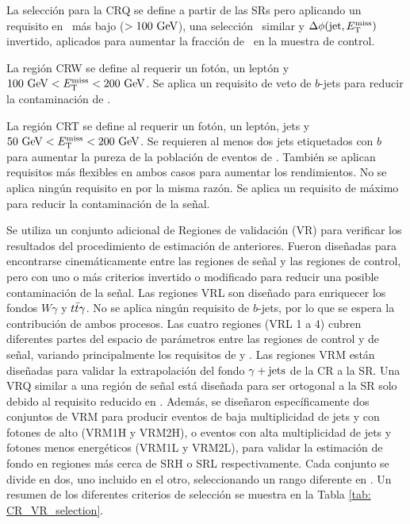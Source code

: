 La selección para la CRQ se define a partir de las SRs pero
aplicando un requisito en \met\ más bajo ($> 100\ \gev $), una selección \HT\ similar
y $ \Delta\phi(\text{jet}, E_{\text{T}}^{\text{miss}})$ invertido, aplicados para aumentar la fracción de
\phj\ en la muestra de control.

La región CRW se define al requerir un fotón, un leptón y $ 100\ \text{GeV} <E_{\text{T}}^{\text{miss}} <200 \ \text{GeV} $. Se aplica un requisito de veto de $b$-jets para reducir la contaminación de \ttbarph.

La región CRT se define al requerir un fotón, un leptón, jets y $ 50 \ \text{GeV} <E_{\text{T}}^{\text{miss}} <200 \ \text{GeV} $. Se requieren al menos dos jets etiquetados con $b$ para aumentar la pureza de la población de eventos de \ttbarph. También se aplican requisitos más flexibles en ambos casos para aumentar los rendimientos. No se aplica ningún requisito en \rtf por la misma razón. Se aplica un requisito de \met máximo para reducir la contaminación de la señal.

Se utiliza un conjunto adicional de Regiones de validación (VR) para verificar
los resultados del procedimiento de estimación de anteriores. Fueron diseñadas para encontrarse
cinemáticamente entre las regiones de señal y las regiones de control, pero con uno o más criterios
invertido o modificado para reducir una posible contaminación de la señal. Las regiones VRL son
diseñado para enriquecer los fondos $ W \gamma $ y $ t\bar{t}\gamma $. No se aplica ningún requisito de $ b $-jets,
por lo que se espera la contribución de ambos procesos. Las cuatro regiones (VRL 1 a 4) cubren
diferentes partes del espacio de parámetros entre las regiones de control y de señal, variando principalmente los requisitos de \met y \HT.
Las regiones VRM están diseñadas para validar la extrapolación del fondo $ \gamma + \text{jets}$ de la CR a la SR.
Una VRQ similar a una región de señal está diseñada para ser ortogonal a la SR solo debido al requisito reducido en \met.
Además, se diseñaron específicamente dos conjuntos de VRM para producir eventos de baja multiplicidad de jets y con fotones de alto \pt (VRM1H y VRM2H), o eventos con alta multiplicidad de jets y fotones menos energéticos (VRM1L y VRM2L), para validar la estimación de fondo en regiones
más cerca de SRH o SRL respectivamente. Cada conjunto se divide en dos, uno incluido en el otro, seleccionando un rango diferente en \met.
Un resumen de los diferentes criterios de selección se muestra en la Tabla \ref{tab: CR_VR_selection}. 

